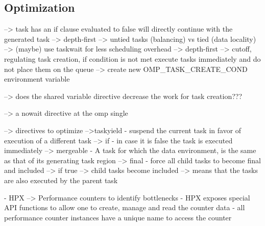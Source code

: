 	
	
\subsection{Optimization}
	
	\cite{LaGrone.2011}
	--> task has an if clause evaluated to false will directly continue with the generated task --> depth-first
	--> untied tasks (balancing) vs tied (data locality)
	--> (maybe) use taskwait for less scheduling overhead --> depth-first
	--> cutoff, regulating task creation, if condition is not met execute tasks immediately and do not place them on the queue
		--> create new OMP\_TASK\_CREATE\_COND environment variable
		
    --> does the shared variable directive decrease the work for task creation???
    
    --> a nowait directive at the omp single
    
    \cite{MKlemm.2018}
 --> directives to optimize
 	-->taskyield - suspend the current task in favor of execution of a different task
 	--> if - in case it is false the task is executed immediately
 	--> mergeable - A task for which the data environment, is the same as that of its generating task region
 	--> final - force all child tasks to become final and included
 		--> if true --> child tasks become included --> means that the tasks are also executed by the parent task


  \cite{TheSTEARGroup.2020}
    - HPX --> Performance counters to identify bottlenecks
    - HPX exposes special API functions to allow one to create, manage and read the counter data
    - all performance counter instances have a unique name to access the counter